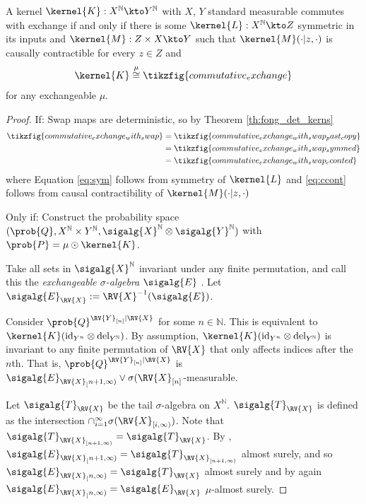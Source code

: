 \begin{lemma}\label{lem:exch_prod_ciid}
A kernel $\kernel{K}:X^{\mathbb{N}}\kto Y^{\mathbb{N}}$ with $X$, $Y$ standard measurable commutes with exchange if and only if there is some $\kernel{L}:X^{\mathbb{N}}\kto Z$ symmetric in its inputs and $\kernel{M}:Z\times X\kto Y$ such that $\kernel{M}(\cdot|z,\cdot)$ is causally contractible for every $z\in Z$ and
\begin{align}
    \kernel{K} \overset{\mu}{\cong} \tikzfig{commutative_exchange}
\end{align}
for any exchangeable $\mu$.
\end{lemma}

\begin{proof}
If:
Swap maps are deterministic, so by Theorem \ref{th:fong_det_kerns}
\begin{align}
    \tikzfig{commutative_exchange_with_swap} &= \tikzfig{commutative_exchange_with_swap_past_copy}\\
    &= \tikzfig{commutative_exchange_with_swap_symmed}\label{eq:sym}\\
    &= \tikzfig{commutative_exchange_with_swap_cconted}\label{eq:ccont}
\end{align}
where Equation \ref{eq:sym} follows from symmetry of $\kernel{L}$ and \ref{eq:ccont} follows from causal contractibility of $\kernel{M}(\cdot|z,\cdot)$

Only if:
Construct the probability space $(\prob{Q},X^{\mathbb{N}}\times Y^{\mathbb{N}},\sigalg{X}^{\mathbb{N}}\otimes\sigalg{Y}^{\mathbb{N}})$ with $\prob{P}=\mu\odot\kernel{K}$.

Take all sets in $\sigalg{X}^{\mathbb{N}}$ invariant under any finite permutation, and call this the \emph{exchangeable $\sigma$-algebra} $\sigalg{E}$ \citep[pg. 29]{kallenberg_basic_2005}. Let $\sigalg{E}_{\RV{X}}:=\RV{X}^{-1}(\sigalg{E})$.

Consider $\prob{Q}^{\RV{Y}_{[n]}|\RV{X}}$ for some $n\in \mathbb{N}$. This is equivalent to $\kernel{K}(\text{id}_{Y^n}\otimes \text{del}_{Y^{\mathbb{N}}})$. By assumption, $\kernel{K}(\text{id}_{Y^n}\otimes \text{del}_{Y^{\mathbb{N}}})$ is invariant to any finite permutation of $\RV{X}$ that only affects indices after the $n$th. That is, $\prob{Q}^{\RV{Y}_{[n]}|\RV{X}}$ is $\sigalg{E}_{\RV{X}_[n+1,\infty)}\vee\sigma(\RV{X}_{[n]}$-measurable.

Let $\sigalg{T}_{\RV{X}}$ be the tail $\sigma$-algebra on $X^{\mathbb{N}}$. $\sigalg{T}_{\RV{X}}$ is defined as the intersection $\cap_{i=1}^{\infty} \sigma(\RV{X}_{[i,\infty)})$. Note that $\sigalg{T}_{\RV{X}_{[n+1,\infty)}}=\sigalg{T}_{\RV{X}}$. By \citet[Corollary 1.6]{kallenberg_basic_2005}, $\sigalg{E}_{\RV{X}_[n+1,\infty)}=\sigalg{T}_{\RV{X}_{[n+1,\infty)}}$ almost surely, and so $\sigalg{E}_{\RV{X}_[n,\infty)}=\sigalg{T}_{\RV{X}}$ almost surely and by \citet[Corollary 1.6]{kallenberg_basic_2005} again $\sigalg{E}_{\RV{X}_[n,\infty)}=\sigalg{E}_{\RV{X}}$ $\mu$-almost surely.


\end{proof}

